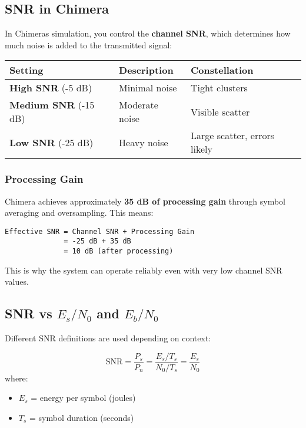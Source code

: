 \subsection{SNR in Chimera}\label{snr-in-chimera}

In Chimera\textquotesingle s simulation, you control the \textbf{channel
SNR}, which determines how much noise is added to the transmitted
signal:

{\def\LTcaptype{} %
\begin{longtable}[]{@{}lll@{}}
\toprule\noalign{}
Setting & Description & Constellation \\
\midrule\noalign{}
\endhead
\bottomrule\noalign{}
\endlastfoot
\textbf{High SNR} (-5 dB) & Minimal noise & Tight clusters \\
\textbf{Medium SNR} (-15 dB) & Moderate noise & Visible scatter \\
\textbf{Low SNR} (-25 dB) & Heavy noise & Large scatter, errors
likely \\
\end{longtable}
}

\subsubsection{Processing Gain}\label{processing-gain}

Chimera achieves approximately \textbf{35 dB of processing gain} through
symbol averaging and oversampling. This means:

\begin{verbatim}
Effective SNR = Channel SNR + Processing Gain
              = -25 dB + 35 dB
              = 10 dB (after processing)
\end{verbatim}

This is why the system can operate reliably even with very low channel
SNR values.

\subsection{SNR vs $E_s/N_0$ and $E_b/N_0$}

Different SNR definitions are used depending on context:

\begin{equation}
\mathrm{SNR} = \frac{P_s}{P_n} = \frac{E_s / T_s}{N_0 / T_s} = \frac{E_s}{N_0}
\end{equation}
where:
\begin{itemize}
\item $E_s$ = energy per symbol (joules)
\item $T_s$ = symbol duration (seconds)
\end{itemize}

